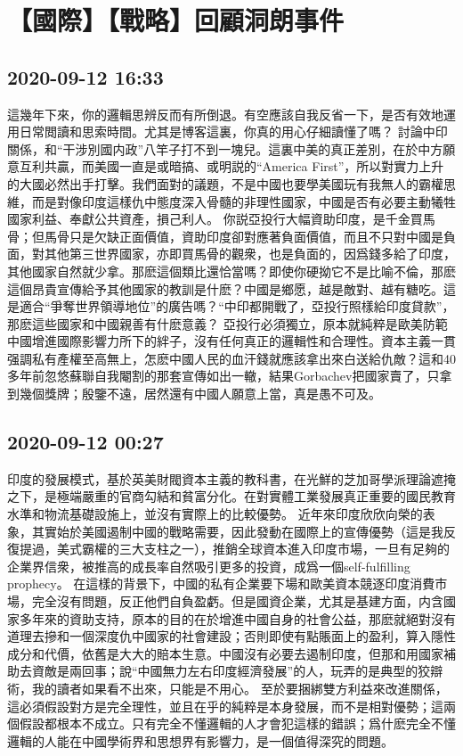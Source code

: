 \documentclass[twocolumn]{ctexart}
\begin{document}
\section*{【國際】【戰略】回顧洞朗事件}
\subsection*{2020-09-12 16:33}

這幾年下來，你的邏輯思辨反而有所倒退。有空應該自我反省一下，是否有效地運用日常閲讀和思索時間。尤其是博客這裏，你真的用心仔細讀懂了嗎？
討論中印關係，和“干涉別國内政”八竿子打不到一塊兒。這裏中美的真正差別，在於中方願意互利共贏，而美國一直是或暗搞、或明説的“America First”，所以對實力上升的大國必然出手打擊。我們面對的議題，不是中國也要學美國玩有我無人的霸權思維，而是對像印度這樣仇中態度深入骨髓的非理性國家，中國是否有必要主動犧牲國家利益、奉獻公共資產，損己利人。
你説亞投行大幅資助印度，是千金買馬骨；但馬骨只是欠缺正面價值，資助印度卻對應著負面價值，而且不只對中國是負面，對其他第三世界國家，亦即買馬骨的觀衆，也是負面的，因爲錢多給了印度，其他國家自然就少拿。那麽這個類比還恰當嗎？即使你硬拗它不是比喻不倫，那麽這個昂貴宣傳給予其他國家的教訓是什麽？中國是鄉愿，越是敵對、越有糖吃。這是適合“爭奪世界領導地位”的廣告嗎？“中印都開戰了，亞投行照樣給印度貸款”，那麽這些國家和中國親善有什麽意義？
亞投行必須獨立，原本就純粹是歐美防範中國增進國際影響力所下的絆子，沒有任何真正的邏輯性和合理性。資本主義一貫强調私有產權至高無上，怎麽中國人民的血汗錢就應該拿出來白送給仇敵？這和40多年前忽悠蘇聯自我閹割的那套宣傳如出一轍，結果Gorbachev把國家賣了，只拿到幾個獎牌；殷鑒不遠，居然還有中國人願意上當，真是愚不可及。
\subsection*{2020-09-12 00:27}

印度的發展模式，基於英美財閥資本主義的教科書，在光鮮的芝加哥學派理論遮掩之下，是極端嚴重的官商勾結和貧富分化。在對實體工業發展真正重要的國民教育水準和物流基礎設施上，並沒有實際上的比較優勢。
近年來印度欣欣向榮的表象，其實始於美國遏制中國的戰略需要，因此發動在國際上的宣傳優勢（這是我反復提過，美式霸權的三大支柱之一），推銷全球資本進入印度市場，一旦有足夠的企業界信衆，被推高的成長率自然吸引更多的投資，成爲一個self-fulfilling prophecy。
在這樣的背景下，中國的私有企業要下場和歐美資本競逐印度消費市場，完全沒有問題，反正他們自負盈虧。但是國資企業，尤其是基建方面，内含國家多年來的資助支持，原本的目的在於增進中國自身的社會公益，那麽就絕對沒有道理去摻和一個深度仇中國家的社會建設；否則即使有點賬面上的盈利，算入隱性成分和代價，依舊是大大的賠本生意。中國沒有必要去遏制印度，但那和用國家補助去資敵是兩回事；說“中國無力左右印度經濟發展”的人，玩弄的是典型的狡辯術，我的讀者如果看不出來，只能是不用心。
至於要捆綁雙方利益來改進關係，這必須假設對方是完全理性，並且在乎的純粹是本身發展，而不是相對優勢；這兩個假設都根本不成立。只有完全不懂邏輯的人才會犯這樣的錯誤；爲什麽完全不懂邏輯的人能在中國學術界和思想界有影響力，是一個值得深究的問題。
\end{document}
